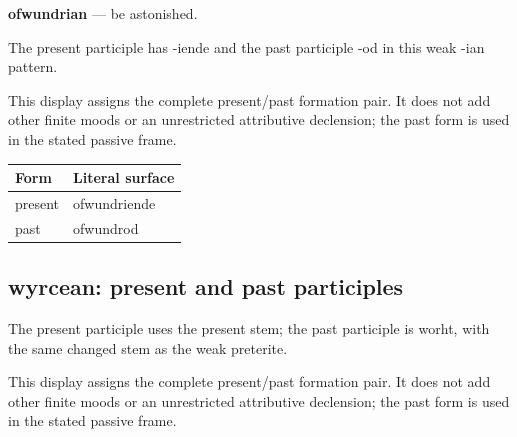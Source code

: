 \par\begin{minipage}{\linewidth}\raggedright
\textbf{ofwundrian} — be astonished.

The present participle has -iende and the past participle -od in this weak -ian pattern.

This display assigns the complete present/\allowbreak{}past formation pair. It does not add other finite moods or an unrestricted attributive declension; the past form is used in the stated passive frame.

\par\begingroup
\fontsize{10.5}{13.2}\selectfont
\setlength{\LTleft}{0pt}\setlength{\LTright}{\fill}
\noindent
\begin{tabular}{@{}>{\raggedright\arraybackslash}p{51.9mm}>{\raggedright\arraybackslash}p{69.29mm}@{}}
\toprule
\textbf{Form} & \textbf{Literal surface} \\
\midrule
present & ofwundriende \\
past & ofwundrod \\
\bottomrule
\end{tabular}
\par\endgroup

\end{minipage}\par
{}
\subsection*{wyrcean: present and past participles}

The present participle uses the present stem; the past participle is worht, with the same changed stem as the weak preterite.

This display assigns the complete present/\allowbreak{}past formation pair. It does not add other finite moods or an unrestricted attributive declension; the past form is used in the stated passive frame.

